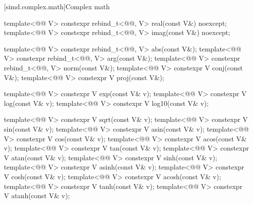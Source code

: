 [simd.complex.math]{Complex math}

\begin{itemdecl}
template<@@ V>
  constexpr rebind_t<@@, V> real(const V&) noexcept;
template<@@ V>
  constexpr rebind_t<@@, V> imag(const V&) noexcept;

template<@@ V>
  constexpr rebind_t<@@, V> abs(const V&);
template<@@ V>
  constexpr rebind_t<@@, V> arg(const V&);
template<@@ V>
  constexpr rebind_t<@@, V> norm(const V&);
template<@@ V> constexpr V conj(const V&);
template<@@ V> constexpr V proj(const V&);

template<@@ V> constexpr V exp(const V& v);
template<@@ V> constexpr V log(const V& v);
template<@@ V> constexpr V log10(const V& v);

template<@@ V> constexpr V sqrt(const V& v);
template<@@ V> constexpr V sin(const V& v);
template<@@ V> constexpr V asin(const V& v);
template<@@ V> constexpr V cos(const V& v);
template<@@ V> constexpr V acos(const V& v);
template<@@ V> constexpr V tan(const V& v);
template<@@ V> constexpr V atan(const V& v);
template<@@ V> constexpr V sinh(const V& v);
template<@@ V> constexpr V asinh(const V& v);
template<@@ V> constexpr V cosh(const V& v);
template<@@ V> constexpr V acosh(const V& v);
template<@@ V> constexpr V tanh(const V& v);
template<@@ V> constexpr V atanh(const V& v);
\end{itemdecl}

